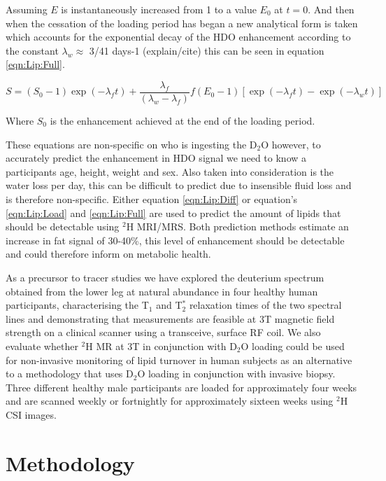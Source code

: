 \documentclass[class=article, crop=false]{standalone}
\begin{document}
Assuming $E$ is instantaneously increased from 1 to a value $E_0$ at $t=0$. And then when the cessation of the loading period has began a new analytical form is taken which accounts for the exponential decay of the HDO enhancement according to the constant $\lambda_w \approx$ 3/41 days-1 (explain/cite) this can be seen in equation \ref{eqn:Lip:Full}.

\begin{equation}
    S = (S_0 - 1)\exp(-\lambda_ft)+\frac{\lambda_f}{(\lambda_w - \lambda_f)}f(E_0 - 1)[\exp(-\lambda_ft)-\exp(-\lambda_wt)]
    \label{eqn:Lip:Full}
\end{equation}

Where $S_0$ is the enhancement achieved at the end of the loading period.

These equations are non-specific on who is ingesting the D$_2$O however, to accurately predict the enhancement in HDO signal we need to know a participants age, height, weight and sex\cite{Watson1980TotalMeasurements}. Also taken into consideration is the water loss per day, this can be difficult to predict due to insensible fluid loss and is therefore non-specific. Either equation \ref{eqn:Lip:Diff} or equation’s \ref{eqn:Lip:Load} and \ref{eqn:Lip:Full} are used to predict the amount of lipids that should be detectable using $^2$H MRI/MRS. Both prediction methods estimate an increase in fat signal of 30-40\%, this level of enhancement should be detectable and could therefore inform on metabolic health. 

As a precursor to tracer studies we have explored the deuterium spectrum obtained from the lower leg at natural abundance in four healthy human participants, characterising the T$_1$ and T$_2^*$ relaxation times of the two spectral lines and demonstrating that measurements are feasible at 3T magnetic field strength on a clinical scanner using a transceive, surface RF coil. We also evaluate whether $^2$H MR at 3T in conjunction with D$_2$O loading could be used for non-invasive monitoring of lipid turnover in human subjects as an alternative to a methodology that uses D$_2$O loading in conjunction with invasive biopsy. Three different healthy male participants are loaded for approximately four weeks and are scanned weekly or fortnightly for approximately sixteen weeks using $^2$H CSI images.

\section{Methodology}
\end{document}

